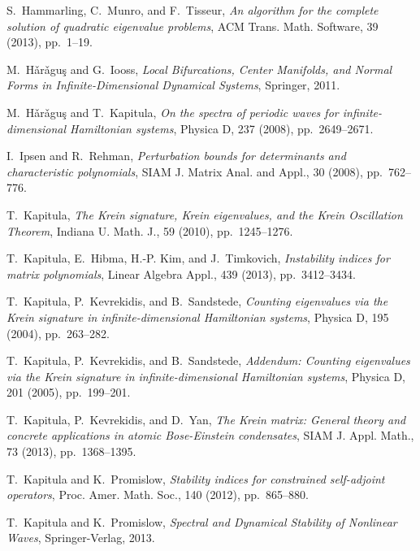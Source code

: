 \documentclass[review,onefignum,onetabnum]{siamart171218}
\begin{document}
\begin{thebibliography}{10}
{\sc S.~Hammarling, C.~Munro, and F.~Tisseur}, {\em An algorithm for the
  complete solution of quadratic eigenvalue problems}, {ACM} Trans. Math.
  Software, 39 (2013), pp.~1--19.

{\sc M.~H\v{a}r\v{a}gu\c{s} and G.~Iooss}, {\em Local Bifurcations, Center
  Manifolds, and Normal Forms in Infinite-Dimensional Dynamical Systems},
  Springer, 2011.

{\sc M.~H\v{a}r\v{a}gu\c{s} and T.~Kapitula}, {\em On the spectra of periodic
  waves for infinite-dimensional {H}amiltonian systems}, Physica D, 237 (2008),
  pp.~2649--2671.

{\sc I.~Ipsen and R.~Rehman}, {\em Perturbation bounds for determinants and
  characteristic polynomials}, {SIAM} J. Matrix Anal. and Appl., 30 (2008),
  pp.~762--776.

{\sc T.~Kapitula}, {\em The {K}rein signature, {K}rein eigenvalues, and the
  {Krein Oscillation Theorem}}, Indiana U. Math. J., 59 (2010), pp.~1245--1276.

{\sc T.~Kapitula, E.~Hibma, H.-P. Kim, and J.~Timkovich}, {\em Instability
  indices for matrix polynomials}, Linear Algebra Appl., 439 (2013),
  pp.~3412--3434.

{\sc T.~Kapitula, P.~Kevrekidis, and B.~Sandstede}, {\em Counting eigenvalues
  via the {K}rein signature in infinite-dimensional {H}amiltonian systems},
  Physica D, 195 (2004), pp.~263--282.

{\sc T.~Kapitula, P.~Kevrekidis, and B.~Sandstede}, {\em Addendum: {C}ounting
  eigenvalues via the {K}rein signature in infinite-dimensional {H}amiltonian
  systems}, Physica D, 201 (2005), pp.~199--201.

{\sc T.~Kapitula, P.~Kevrekidis, and D.~Yan}, {\em The {K}rein matrix:
  {G}eneral theory and concrete applications in atomic {B}ose-{E}instein
  condensates}, SIAM J. Appl. Math., 73 (2013), pp.~1368--1395.

{\sc T.~Kapitula and K.~Promislow}, {\em Stability indices for constrained
  self-adjoint operators}, Proc. Amer. Math. Soc., 140 (2012), pp.~865--880.

{\sc T.~Kapitula and K.~Promislow}, {\em Spectral and Dynamical Stability of
  Nonlinear Waves}, Springer-Verlag, 2013.


\end{thebibliography}
\end{document}
